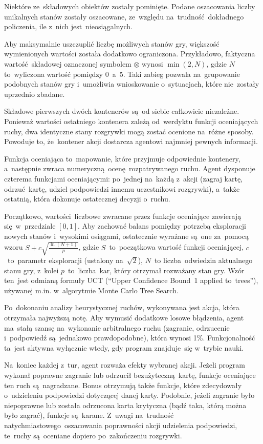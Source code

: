 \documentclass[declaration,shortabstract,inz]{iithesis}
\begin{document}
Niektóre ze~składowych obiektów zostały pominięte. Podane oszacowania liczby unikalnych stanów zostały oszacowane, ze~względu na~trudność dokładnego policzenia, ile z~nich jest~nieosiągalnych.

Aby maksymalnie uszczuplić liczbę możliwych stanów gry, większość wymienionych wartości została dodatkowo ograniczona. Przykładowo, faktyczna wartość składowej oznaczonej symbolem $\otimes$ wynosi $\min{(2, N)}$, gdzie $N$ to~wyliczona wartość pomiędzy 0~a~5. Taki zabieg pozwala na~grupowanie podobnych stanów gry i~umożliwia wnioskowanie o~sytuacjach, które nie~zostały uprzednio zbadane.

Składowe pierwszych dwóch kontenerów są~od siebie całkowicie niezależne. Ponieważ wartości ostatniego kontenera zależą od~werdyktu funkcji oceniających ruchy, dwa identyczne stany rozgrywki mogą zostać ocenione na~różne sposoby. Powoduje to, że~kontener akcji dostarcza agentowi najmniej pewnych informacji.

Funkcja oceniająca to~mapowanie, które przyjmuje odpowiednie kontenery, a~następnie zwraca numeryczną ocenę rozpatrywanego ruchu. Agent dysponuje czterema funkcjami oceniającymi: po~jednej na~każdą z~akcji (zagraj kartę, odrzuć kartę, udziel podpowiedzi innemu uczestnikowi rozgrywki), a~także ostatnią, która dokonuje ostatecznej decyzji o~ruchu.

Początkowo, wartości liczbowe zwracane przez funkcje oceniające zawierają się w~przedziale $[0,1]$. Aby zachować balans pomiędzy potrzebą eksploracji nowych stanów i~wysokimi osiągami, ostatecznie wyrażane są~one za~pomocą wzoru ${S+c\sqrt{\frac{\ln (N+1)}{p}}}$, gdzie $S$~to~początkowa wartość funkcji oceniającej, $c$~to~parametr eksploracji (ustalony na~$\sqrt{2}$), $N$~to liczba odwiedzin aktualnego stanu gry, z~kolei $p$~to~liczba kar, który otrzymał rozważany stan gry. Wzór ten~jest odmianą formuły UCT (``Upper Confidence Bound~1 applied to~trees''), używanej m.in. w~algorytmie Monte Carlo Tree Search\cite{UCT}.

Po~dokonaniu analizy heurystycznej ruchów, wykonywana jest akcja, która otrzymała najwyższą notę. Aby wymusić dodatkowe losowe błądzenia, agent ma~stałą szansę na~wykonanie arbitralnego ruchu (zagranie, odrzucenie i~podpowiedź są~jednakowo prawdopodobne), która wynosi 1\%. Funkcjonalność ta~jest aktywna wyłącznie wtedy, gdy program znajduje~się w~trybie nauki.

Na~koniec każdej z~tur, agent rozważa efekty wybranej akcji. Jeżeli program wykonał poprawne zagranie lub odrzucił bezużyteczną kartę, funkcje oceniające ten ruch są~nagradzane. Bonus otrzymują także funkcje, które zdecydowały o~udzieleniu podpowiedzi dotyczącej danej karty. Podobnie, jeżeli zagranie było niepoprawne lub została odrzucona karta krytyczna (bądź taka, którą można było zagrać), funkcje są~karane. Z~uwagi na~trudność natychmiastowego oszacowania poprawności akcji udzielenia podpowiedzi, te~ruchy są~oceniane dopiero po~zakończeniu rozgrywki.
\end{document}
